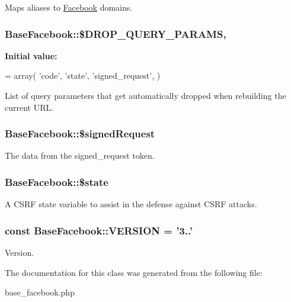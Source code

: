 Maps aliases to \hyperlink{class_facebook}{Facebook} domains. \hypertarget{class_base_facebook_a463779b23fc993650d18af395979501d}{
\subsubsection[{\$\-D\-R\-O\-P\-\_\-\-Q\-U\-E\-R\-Y\-\_\-\-P\-A\-R\-A\-M\-S}]{\setlength{\rightskip}{0pt plus 5cm}Base\-Facebook\-::\$\-D\-R\-O\-P\-\_\-\-Q\-U\-E\-R\-Y\-\_\-\-P\-A\-R\-A\-M\-S\hspace{0.3cm}{\ttfamily [static]}, {\ttfamily [protected]}}}\label{class_base_facebook_a463779b23fc993650d18af395979501d}
{\bfseries Initial value\-:}
\begin{DoxyCode}
= array(
    \textcolor{stringliteral}{'code'},
    \textcolor{stringliteral}{'state'},
    \textcolor{stringliteral}{'signed\_request'},
  )
\end{DoxyCode}
List of query parameters that get automatically dropped when rebuilding the current U\-R\-L. \hypertarget{class_base_facebook_a90c6ec44757d540ffe1539f512af7469}{
\subsubsection[{\$signed\-Request}]{\setlength{\rightskip}{0pt plus 5cm}Base\-Facebook\-::\$signed\-Request\hspace{0.3cm}{\ttfamily [protected]}}}\label{class_base_facebook_a90c6ec44757d540ffe1539f512af7469}
The data from the signed\-\_\-request token. \hypertarget{class_base_facebook_a8c3903cc0e9a12c87dfae721648491a2}{
\subsubsection[{\$state}]{\setlength{\rightskip}{0pt plus 5cm}Base\-Facebook\-::\$state\hspace{0.3cm}{\ttfamily [protected]}}}\label{class_base_facebook_a8c3903cc0e9a12c87dfae721648491a2}
A C\-S\-R\-F state variable to assist in the defense against C\-S\-R\-F attacks. \hypertarget{class_base_facebook_ae0ee825ecd33e197a890c9b47ee14bd8}{
\subsubsection[{V\-E\-R\-S\-I\-O\-N}]{\setlength{\rightskip}{0pt plus 5cm}const Base\-Facebook\-::\-V\-E\-R\-S\-I\-O\-N = '3..'}}\label{class_base_facebook_ae0ee825ecd33e197a890c9b47ee14bd8}
Version. 

The documentation for this class was generated from the following file\-:\begin{DoxyCompactItemize}
\item 
base\-\_\-facebook.\-php\end{DoxyCompactItemize}
